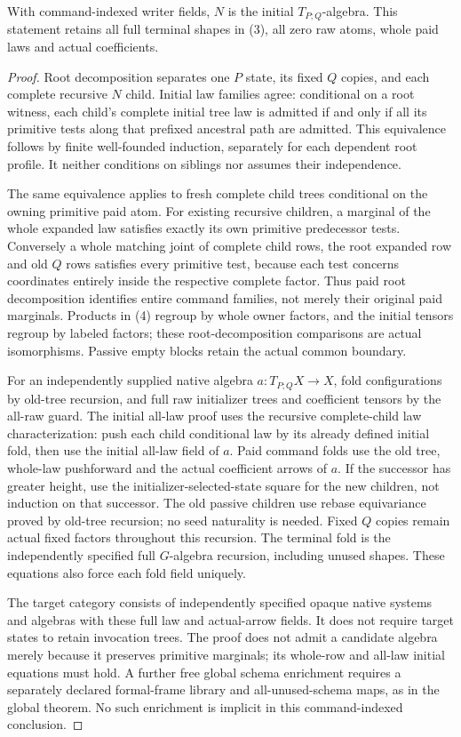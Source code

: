 \documentclass[11pt]{article}
\begin{document}
\begin{theorem}
With command-indexed writer fields, $N$ is the initial $T_{P;Q}$-algebra. This statement retains all full terminal shapes in (3), all zero raw atoms, whole paid laws and actual coefficients.
\end{theorem}
\begin{proof}
Root decomposition separates one $P$ state, its fixed $Q$ copies, and each complete recursive $N$ child. Initial law families agree: conditional on a root witness, each child's complete initial tree law is admitted if and only if all its primitive tests along that prefixed ancestral path are admitted. This equivalence follows by finite well-founded induction, separately for each dependent root profile. It neither conditions on siblings nor assumes their independence.

The same equivalence applies to fresh complete child trees conditional on the owning primitive paid atom. For existing recursive children, a marginal of the whole expanded law satisfies exactly its own primitive predecessor tests. Conversely a whole matching joint of complete child rows, the root expanded row and old $Q$ rows satisfies every primitive test, because each test concerns coordinates entirely inside the respective complete factor. Thus paid root decomposition identifies entire command families, not merely their original paid marginals. Products in (4) regroup by whole owner factors, and the initial tensors regroup by labeled factors; these root-decomposition comparisons are actual isomorphisms. Passive empty blocks retain the actual common boundary.

For an independently supplied native algebra $a:T_{P;Q}X\to X$, fold configurations by old-tree recursion, and full raw initializer trees and coefficient tensors by the all-raw guard. The initial all-law proof uses the recursive complete-child law characterization: push each child conditional law by its already defined initial fold, then use the initial all-law field of $a$. Paid command folds use the old tree, whole-law pushforward and the actual coefficient arrows of $a$. If the successor has greater height, use the initializer-selected-state square for the new children, not induction on that successor. The old passive children use rebase equivariance proved by old-tree recursion; no seed naturality is needed. Fixed $Q$ copies remain actual fixed factors throughout this recursion. The terminal fold is the independently specified full $G$-algebra recursion, including unused shapes. These equations also force each fold field uniquely.

The target category consists of independently specified opaque native systems and algebras with these full law and actual-arrow fields. It does not require target states to retain invocation trees. The proof does not admit a candidate algebra merely because it preserves primitive marginals; its whole-row and all-law initial equations must hold. A further free global schema enrichment requires a separately declared formal-frame library and all-unused-schema maps, as in the global theorem. No such enrichment is implicit in this command-indexed conclusion.
\end{proof}
\end{document}
